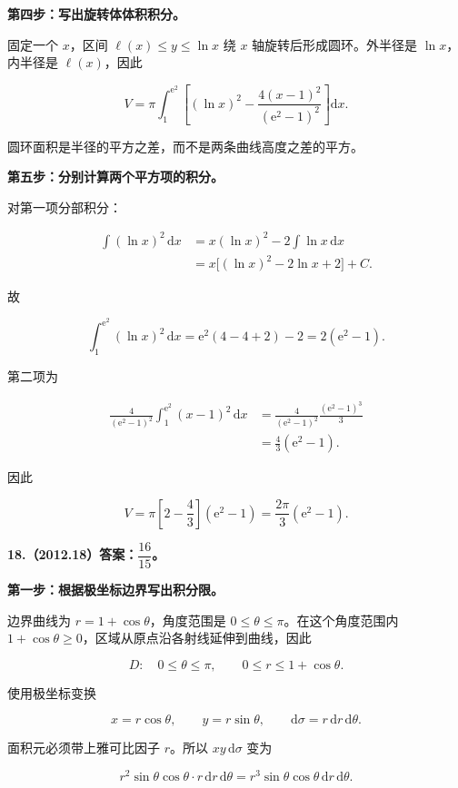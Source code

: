 \documentclass[UTF8,11pt,fontset=windows]{ctexart}
\begin{document}
\textbf{第四步：写出旋转体体积积分。}

固定一个 $x$，区间 $\ell(x)\le y\le\ln x$ 绕 $x$ 轴旋转后形成圆环。外半径是 $\ln x$，内半径是 $\ell(x)$，因此

$$
V=\pi\int_1^{\mathrm e^2}
\left[(\ln x)^2-\frac{4(x-1)^2}{(\mathrm e^2-1)^2}\right]\mathrm dx.
$$

圆环面积是半径的平方之差，而不是两条曲线高度之差的平方。

\textbf{第五步：分别计算两个平方项的积分。}

对第一项分部积分：

$$
\begin{aligned}
\int(\ln x)^2\,\mathrm dx
&=x(\ln x)^2-2\int\ln x\,\mathrm dx\\
&=x\big[(\ln x)^2-2\ln x+2\big]+C.
\end{aligned}
$$

故

$$
\int_1^{\mathrm e^2}(\ln x)^2\,\mathrm dx
=\mathrm e^2(4-4+2)-2
=2(\mathrm e^2-1).
$$

第二项为

$$
\begin{aligned}
\frac4{(\mathrm e^2-1)^2}
\int_1^{\mathrm e^2}(x-1)^2\,\mathrm dx
&=\frac4{(\mathrm e^2-1)^2}\frac{(\mathrm e^2-1)^3}{3}\\
&=\frac43(\mathrm e^2-1).
\end{aligned}
$$

因此

$$
V=\pi\left[2-\frac43\right](\mathrm e^2-1)
=\frac{2\pi}{3}(\mathrm e^2-1).
$$

\clearpage

\textbf{18.（2012.18）答案：$\dfrac{16}{15}$。}

\textbf{第一步：根据极坐标边界写出积分限。}

边界曲线为 $r=1+\cos\theta$，角度范围是 $0\le\theta\le\pi$。在这个角度范围内 $1+\cos\theta\ge0$，区域从原点沿各射线延伸到曲线，因此

$$
D:\quad0\le\theta\le\pi,
\qquad0\le r\le1+\cos\theta.
$$

使用极坐标变换

$$
x=r\cos\theta,
\qquad y=r\sin\theta,
\qquad\mathrm d\sigma=r\,\mathrm dr\,\mathrm d\theta.
$$

面积元必须带上雅可比因子 $r$。所以 $xy\,\mathrm d\sigma$ 变为

$$
r^2\sin\theta\cos\theta\cdot r\,\mathrm dr\,\mathrm d\theta
=r^3\sin\theta\cos\theta\,\mathrm dr\,\mathrm d\theta.
$$
\end{document}
